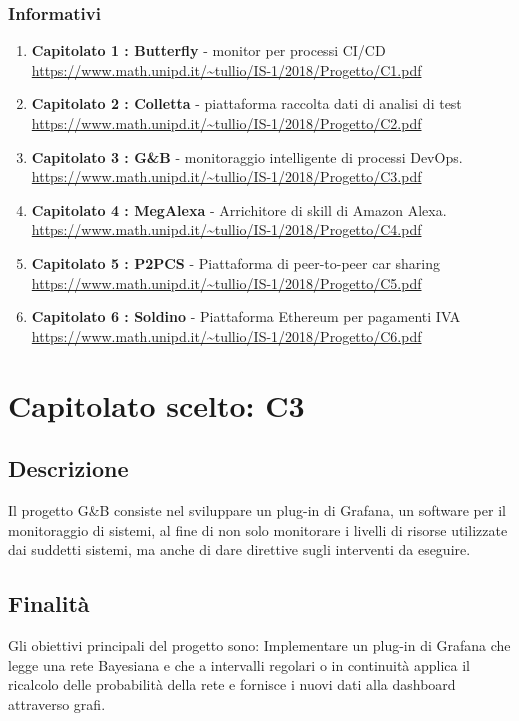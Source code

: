 \documentclass{article}
\begin{document}
         \subsubsection{Informativi}
            \begin{enumerate}
                \item \textbf{Capitolato 1 : Butterfly} - monitor per processi CI/CD \newline 	\url{ https://www.math.unipd.it/~tullio/IS-1/2018/Progetto/C1.pdf}
			    \item \textbf{Capitolato 2 : Colletta} - piattaforma raccolta dati di analisi di test \newline   \url{https://www.math.unipd.it/~tullio/IS-1/2018/Progetto/C2.pdf}
                \item \textbf{Capitolato 3 : G\&B} - monitoraggio intelligente di processi DevOps. \newline \url{https://www.math.unipd.it/~tullio/IS-1/2018/Progetto/C3.pdf}
                \item \textbf{Capitolato 4 : MegAlexa} - Arrichitore di skill di Amazon Alexa. \newline \url{https://www.math.unipd.it/~tullio/IS-1/2018/Progetto/C4.pdf}
                \item \textbf{Capitolato 5 : P2PCS} - Piattaforma di peer-to-peer car sharing \newline  \url{https://www.math.unipd.it/~tullio/IS-1/2018/Progetto/C5.pdf}
                \item \textbf{Capitolato 6 : Soldino} - Piattaforma Ethereum per pagamenti IVA \newline \url{https://www.math.unipd.it/~tullio/IS-1/2018/Progetto/C6.pdf}
            \end{enumerate}
			
\newpage
    \section{Capitolato scelto: C3}
        \subsection{Descrizione}
            Il progetto G\&B consiste nel sviluppare un plug-in di Grafana, un software per il monitoraggio di sistemi, al fine di non solo monitorare i livelli di risorse utilizzate dai suddetti sistemi, ma anche di dare direttive sugli interventi da eseguire.
        \subsection{Finalità}
            Gli obiettivi principali del progetto sono: Implementare un plug-in di Grafana che legge una rete Bayesiana e che a intervalli regolari o in continuità applica il ricalcolo delle probabilità della rete e fornisce i nuovi dati alla dashboard attraverso grafi.
\end{document}
